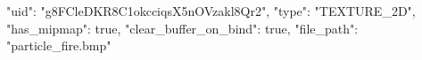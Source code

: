 {
    "uid": "g8FCleDKR8C1okcciqsX5nOVzakl8Qr2",
    "type": "TEXTURE_2D",
    "has_mipmap": true,
    "clear_buffer_on_bind": true,
    "file_path": "particle_fire.bmp"
}